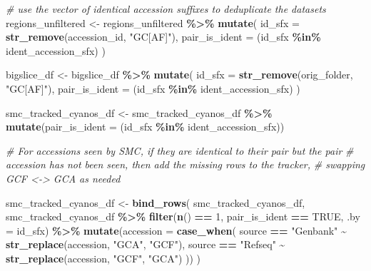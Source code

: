 \documentclass[
]{article}
\newenvironment{Shaded}{\begin{snugshade}}{\end{snugshade}}
\newcommand{\AttributeTok}[1]{\textcolor[rgb]{0.13,0.29,0.53}{#1}}
\newcommand{\CommentTok}[1]{\textcolor[rgb]{0.56,0.35,0.01}{\textit{#1}}}
\newcommand{\ConstantTok}[1]{\textcolor[rgb]{0.56,0.35,0.01}{#1}}
\newcommand{\DecValTok}[1]{\textcolor[rgb]{0.00,0.00,0.81}{#1}}
\newcommand{\FunctionTok}[1]{\textcolor[rgb]{0.13,0.29,0.53}{\textbf{#1}}}
\newcommand{\NormalTok}[1]{#1}
\newcommand{\OtherTok}[1]{\textcolor[rgb]{0.56,0.35,0.01}{#1}}
\newcommand{\SpecialCharTok}[1]{\textcolor[rgb]{0.81,0.36,0.00}{\textbf{#1}}}
\newcommand{\StringTok}[1]{\textcolor[rgb]{0.31,0.60,0.02}{#1}}
\begin{document}
\begin{Shaded}
\begin{Highlighting}[]
\CommentTok{\# use the vector of identical accession suffixes to deduplicate the datasets}
\NormalTok{regions\_unfiltered }\OtherTok{\textless{}{-}}\NormalTok{ regions\_unfiltered }\SpecialCharTok{\%\textgreater{}\%} 
  \FunctionTok{mutate}\NormalTok{(}
    \AttributeTok{id\_sfx =} \FunctionTok{str\_remove}\NormalTok{(accession\_id, }\StringTok{"GC[AF]"}\NormalTok{), }
    \AttributeTok{pair\_is\_ident =}\NormalTok{ (id\_sfx }\SpecialCharTok{\%in\%}\NormalTok{ ident\_accession\_sfx)}
\NormalTok{  )}

\NormalTok{bigslice\_df }\OtherTok{\textless{}{-}}\NormalTok{ bigslice\_df }\SpecialCharTok{\%\textgreater{}\%}
  \FunctionTok{mutate}\NormalTok{(}
    \AttributeTok{id\_sfx =} \FunctionTok{str\_remove}\NormalTok{(orig\_folder, }\StringTok{"GC[AF]"}\NormalTok{),}
    \AttributeTok{pair\_is\_ident =}\NormalTok{ (id\_sfx }\SpecialCharTok{\%in\%}\NormalTok{ ident\_accession\_sfx)}
\NormalTok{  )}

\NormalTok{smc\_tracked\_cyanos\_df }\OtherTok{\textless{}{-}}\NormalTok{ smc\_tracked\_cyanos\_df }\SpecialCharTok{\%\textgreater{}\%}
  \FunctionTok{mutate}\NormalTok{(}\AttributeTok{pair\_is\_ident =}\NormalTok{ (id\_sfx }\SpecialCharTok{\%in\%}\NormalTok{ ident\_accession\_sfx))}

\CommentTok{\# For accessions seen by SMC, if they are identical to their pair but the pair }
\CommentTok{\# accession has not been seen, then add the missing rows to the tracker, }
\CommentTok{\# swapping GCF \textless{}{-}\textgreater{} GCA as needed}

\NormalTok{smc\_tracked\_cyanos\_df }\OtherTok{\textless{}{-}} \FunctionTok{bind\_rows}\NormalTok{(}
\NormalTok{  smc\_tracked\_cyanos\_df,}
\NormalTok{  smc\_tracked\_cyanos\_df }\SpecialCharTok{\%\textgreater{}\%} 
  \FunctionTok{filter}\NormalTok{(}\FunctionTok{n}\NormalTok{() }\SpecialCharTok{==} \DecValTok{1}\NormalTok{, pair\_is\_ident }\SpecialCharTok{==} \ConstantTok{TRUE}\NormalTok{, }\AttributeTok{.by =}\NormalTok{ id\_sfx) }\SpecialCharTok{\%\textgreater{}\%} 
  \FunctionTok{mutate}\NormalTok{(}\AttributeTok{accession =} \FunctionTok{case\_when}\NormalTok{(}
\NormalTok{    source }\SpecialCharTok{==} \StringTok{"Genbank"} \SpecialCharTok{\textasciitilde{}} \FunctionTok{str\_replace}\NormalTok{(accession, }\StringTok{"GCA"}\NormalTok{, }\StringTok{"GCF"}\NormalTok{), }
\NormalTok{    source }\SpecialCharTok{==} \StringTok{"Refseq"} \SpecialCharTok{\textasciitilde{}} \FunctionTok{str\_replace}\NormalTok{(accession, }\StringTok{"GCF"}\NormalTok{, }\StringTok{"GCA"}\NormalTok{)}
\NormalTok{  ))}
\NormalTok{)}
\end{Highlighting}
\end{Shaded}
\end{document}
